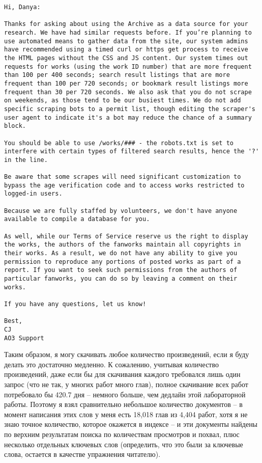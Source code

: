 \documentclass[a4page]{article}
\begin{document}
\begin{verbatim}
Hi, Danya:

Thanks for asking about using the Archive as a data source for your research. We have had similar requests before. If you’re planning to use automated means to gather data from the site, our system admins have recommended using a timed curl or https get process to receive the HTML pages without the CSS and JS content. Our system times out requests for works (using the work ID number) that are more frequent than 100 per 400 seconds; search result listings that are more frequent than 100 per 720 seconds; or bookmark result listings more frequent than 30 per 720 seconds. We also ask that you do not scrape on weekends, as those tend to be our busiest times. We do not add specific scraping bots to a permit list, though editing the scraper's user agent to indicate it's a bot may reduce the chance of a summary block.

You should be able to use /works/### - the robots.txt is set to interfere with certain types of filtered search results, hence the '?' in the line.

Be aware that some scrapes will need significant customization to bypass the age verification code and to access works restricted to logged-in users.

Because we are fully staffed by volunteers, we don't have anyone available to compile a database for you.

As well, while our Terms of Service reserve us the right to display the works, the authors of the fanworks maintain all copyrights in their works. As a result, we do not have any ability to give you permission to reproduce any portions of posted works as part of a report. If you want to seek such permissions from the authors of particular fanworks, you can do so by leaving a comment on their works.

If you have any questions, let us know!

Best,
CJ
AO3 Support
\end{verbatim}

Таким образом, я могу скачивать любое количество произведений, если я буду делать это достаточно медленно. К сожалению, учитывая количество произведений, даже если бы для скачивания каждого требовался лишь один запрос (что не так, у многих работ много глав), полное скачивание всех работ потребовало бы 420.7 дня -- немного больше, чем дедлайн этой лабораторной работы. Поэтому я взял сравнительно небольшое количество документов -- в момент написания этих слов у меня есть 18,018 глав из 4,404 работ, хотя я не знаю точное количество, которое окажется в индексе -- и эти документы найдены по верхним результатам поиска по количествам просмотров и похвал, плюс несколько отдельных ключевых слов (определить, что это были за ключевые слова, остается в качестве упражнения читателю).
\end{document}

